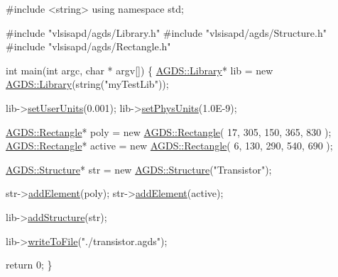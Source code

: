 \begin{DoxyCodeInclude}
\textcolor{preprocessor}{#include <string>}
\textcolor{keyword}{using namespace }std;

\textcolor{preprocessor}{#include "vlsisapd/agds/Library.h"}
\textcolor{preprocessor}{#include "vlsisapd/agds/Structure.h"}
\textcolor{preprocessor}{#include "vlsisapd/agds/Rectangle.h"}

\textcolor{keywordtype}{int} main(\textcolor{keywordtype}{int} argc, \textcolor{keywordtype}{char} * argv[]) \{
    \hyperlink{class_a_g_d_s_1_1_library}{AGDS::Library}* lib = \textcolor{keyword}{new} \hyperlink{class_a_g_d_s_1_1_library}{AGDS::Library}(\textcolor{keywordtype}{string}(\textcolor{stringliteral}{"myTestLib"}));

    lib->\hyperlink{class_a_g_d_s_1_1_library_a0d0e972bb142f892c462bb8d7f04a50b}{setUserUnits}(0.001);
    lib->\hyperlink{class_a_g_d_s_1_1_library_a938acb6eb8d14aade9dba7331c75ff0a}{setPhysUnits}(1.0E-9);

    \hyperlink{class_a_g_d_s_1_1_rectangle}{AGDS::Rectangle}* poly   = \textcolor{keyword}{new} \hyperlink{class_a_g_d_s_1_1_rectangle}{AGDS::Rectangle}( 17, 305, 150, 365, 830 );
    \hyperlink{class_a_g_d_s_1_1_rectangle}{AGDS::Rectangle}* active = \textcolor{keyword}{new} \hyperlink{class_a_g_d_s_1_1_rectangle}{AGDS::Rectangle}(  6, 130, 290, 540, 690 );

    \hyperlink{class_a_g_d_s_1_1_structure}{AGDS::Structure}* str = \textcolor{keyword}{new} \hyperlink{class_a_g_d_s_1_1_structure}{AGDS::Structure}(\textcolor{stringliteral}{"Transistor"});

    str->\hyperlink{class_a_g_d_s_1_1_structure_a2dd203e6770f7d15d6f706867c919a60}{addElement}(poly);
    str->\hyperlink{class_a_g_d_s_1_1_structure_a2dd203e6770f7d15d6f706867c919a60}{addElement}(active);

    lib->\hyperlink{class_a_g_d_s_1_1_library_a93d333a20154e0b688ff3ff213039171}{addStructure}(str);

    lib->\hyperlink{class_a_g_d_s_1_1_library_a33b9d989b84857f46034085664ff3fa2}{writeToFile}(\textcolor{stringliteral}{"./transistor.agds"});
    
    \textcolor{keywordflow}{return} 0;
\}

\end{DoxyCodeInclude}


